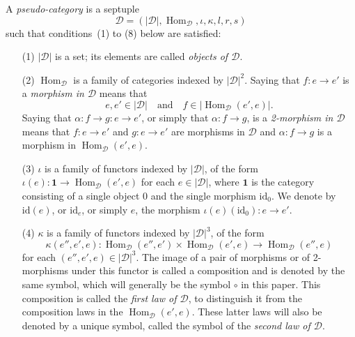 \documentclass[fleqn]{article}
\newcommand{\id}{\mathrm{id}}
\newcommand{\textand}{\quad\text{and}\quad}
\newcommand{\cat}[1]{\mathcal{#1}}
\newcommand{\set}[1]{|#1|}
\DeclareMathOperator{\Hom}{Hom}
\begin{document}
A \emph{pseudo-category} is a septuple
\[
  \cat{D}
  = (\set{\cat{D}},\Hom_\cat{D},\iota,\kappa,l,r,s)
\]
such that conditions~(1) to (8) below are satisfied:
\begin{enumerate}
  \item[(1)]
    $\set{\cat{D}}$ is a set; its elements are called \emph{objects of $\cat{D}$}.

  \item[(2)]
    $\Hom_\cat{D}$ is a family of categories indexed by $\set{\cat{D}}^2$.
    Saying that $f\colon e\to e'$ is a \emph{morphism in $\cat{D}$} means that
    \[
      e,e'\in\set{\cat{D}}
      \textand
      f\in\set{\Hom_\cat{D}(e',e)}.
    \]
    Saying that $\alpha\colon f\to g\colon e\to e'$, or simply that $\alpha\colon f\to g$, is a \emph{2-morphism in $\cat{D}$} means that $f\colon e\to e'$ and $g\colon e\to e'$ are morphisms in $\cat{D}$ and $\alpha\colon f\to g$ is a morphism in $\Hom_\cat{D}(e',e)$.

  \item[(3)]
    $\iota$ is a family of functors indexed by $\set{\cat{D}}$, of the form $\iota(e)\colon\mathbf{1}\to\Hom_\cat{D}(e',e)$ for each $e\in\set{\cat{D}}$, where $\mathbf{1}$ is the category consisting of a single object $0$ and the single morphism $\id_0$.
    We denote by $\id(e)$, or $\id_e$, or simply $e$, the morphism $\iota(e)(\id_0)\colon e\to e'$.

  \item[(4)]
    $\kappa$ is a family of functors indexed by $\set{\cat{D}}^3$, of the form
    \[
      \kappa(e'',e',e)\colon
      \Hom_\cat{D}(e'',e')\times\Hom_\cat{D}(e',e)
      \to \Hom_\cat{D}(e'',e)
    \]
    for each $(e'',e',e)\in\set{\cat{D}}^3$.
    The image of a pair of morphisms or of 2-morphisms under this functor is called a composition and is denoted by the same symbol, which will generally be the symbol $\circ$ in this paper.
    This composition is called the \emph{first law of $\cat{D}$}, to distinguish it from the composition laws in the $\Hom_\cat{D}(e',e)$.
    These latter laws will also be denoted by a unique symbol, called the symbol of the \emph{second law of $\cat{D}$}.


\end{enumerate}
\end{document}
